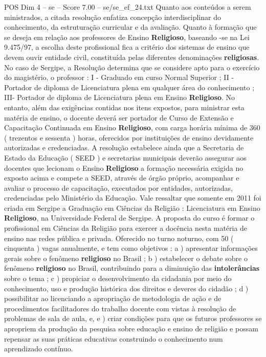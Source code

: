 \begin{textsample}{POS Dim 4 – se – Score 7.00 – se/se\_ef\_24.txt}
Quanto aos conteúdos a serem ministrados, a citada resolução enfatiza concepção interdisciplinar do conhecimento, da estruturação curricular e da avaliação.
Quanto à formação que se deseja em relação aos professores de Ensino \textbf{Religioso}, baseando -se na Lei 9.475/97, a escolha deste profissional fica a critério dos sistemas de ensino que devem ouvir entidade civil, constituída pelas diferentes denominações \textbf{religiosas}.
No caso de Sergipe, a Resolução determina que se considere apto para o exercício do magistério, o professor : I - Graduado em curso Normal Superior ; II - Portador de diploma de Licenciatura plena em qualquer área do conhecimento ; III- Portador de diploma de Licenciatura plena em Ensino \textbf{Religioso}.
No entanto, além das exigências contidas nos itens expostos, para ministrar esta matéria de ensino, o docente deverá ser portador de Curso de Extensão e Capacitação Continuada em Ensino \textbf{Religioso}, com carga horária mínima de 360 ( trezentos e sessenta ) horas, oferecidos por instituições de ensino devidamente autorizadas e credenciadas.
A resolução estabelece ainda que a Secretaria de Estado da Educação ( SEED ) e secretarias municipais deverão assegurar aos docentes que lecionam o Ensino \textbf{Religioso} a formação necessária exigida no exposto acima e compete a SEED, através de órgão próprio, acompanhar e avaliar o processo de capacitação, executados por entidades, autorizadas, credenciadas pelo Ministério da Educação.
Vale ressaltar que somente em 2011 foi criada em Sergipe a Graduação em Ciências da Religião : Licenciatura em Ensino \textbf{Religioso}, na Universidade Federal de Sergipe.
A proposta do curso é formar o profissional em Ciências da Religião para exercer a docência nesta matéria de ensino nas redes pública e privada.
Oferecido no turno noturno, com 50 ( cinquenta ) vagas anualmente, e tem como objetivos : a ) apresentar informações gerais sobre o fenômeno \textbf{religioso} no Brasil ; b ) estabelecer o debate sobre o fenômeno \textbf{religioso} no Brasil, contribuindo para a diminuição das \textbf{intolerâncias} sobre o tema ; c ) propiciar o desenvolvimento da cidadania por meio do conhecimento, uso e produção histórica dos direitos e deveres do cidadão ; d ) possibilitar ao licenciando a apropriação de metodologia de ação e de procedimentos facilitadores do trabalho docente com vistas à resolução de problemas de sala de aula, e, e ) criar condições para que os futuros professores se apropriem da produção da pesquisa sobre educação e ensino de religião e possam repensar as suas práticas educativas construindo o conhecimento num aprendizado contínuo.

\end{textsample}
